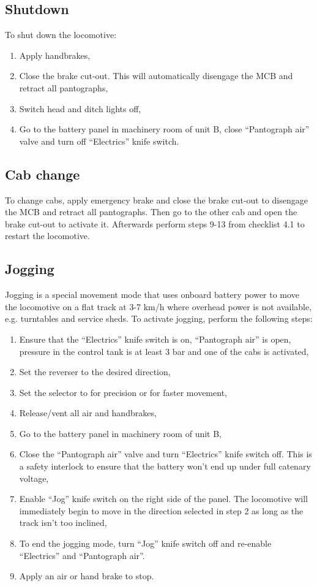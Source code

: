 \documentclass[11pt, a4paper]{article}
\newcommand{\powermode}[1]{%
    \begingroup
    \setlength{\fboxsep}{0pt}%
    \raisebox{0.1em}{%
        \colorbox{black}{%
            \parbox[c][1.4em][c]{1.4em}{%
                \centering
                \color{white}\bfseries #1%
            }%
        }%
    }%
    \endgroup
}
\begin{document}
\subsection{Shutdown}
To shut down the locomotive:
\begin{enumerate}
\item Apply handbrakes,
\item Close the brake cut-out. This will automatically disengage the MCB and retract all pantographs,
\item Switch head and ditch lights off,
\item Go to the battery panel in machinery room of unit B, close ``Pantograph air'' valve and turn off ``Electrics'' knife switch.
\end{enumerate}

\subsection{Cab change}
To change cabs, apply emergency brake and close the brake cut-out to disengage the MCB and retract all pantographs. Then go to the other cab and open the brake cut-out to activate it. Afterwards perform steps 9-13 from checklist 4.1 to restart the locomotive.

\subsection{Jogging}\label{sec:jogging}
Jogging is a special movement mode that uses onboard battery power to move the locomotive on a flat track at 3-7 km/h where overhead power is not available, e.g. turntables and service sheds. To activate jogging, perform the following steps:
\begin{enumerate}
\item Ensure that the ``Electrics'' knife switch is on, ``Pantograph air'' is open, pressure in the control tank is at least 3 bar and one of the cabs is activated,
\item Set the reverser to the desired direction,
\item Set the selector to \powermode{Y} for precision or \powermode{S} for faster movement,
\item Release/vent all air and handbrakes,
\item Go to the battery panel in machinery room of unit B,
\item Close the ``Pantograph air'' valve and turn ``Electrics'' knife switch off. This is a safety interlock to ensure that the battery won't end up under full catenary voltage,
\item Enable ``Jog'' knife switch on the right side of the panel. The locomotive will immediately begin to move in the direction selected in step 2 as long as the track isn't too inclined,
\item To end the jogging mode, turn ``Jog'' knife switch off and re-enable ``Electrics'' and ``Pantograph air''.
\item Apply an air or hand brake to stop.
\end{enumerate}
\end{document}

